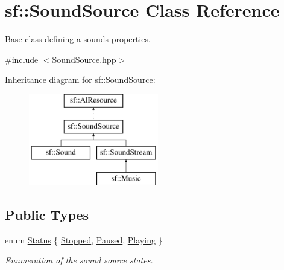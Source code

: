\hypertarget{classsf_1_1_sound_source}{}\section{sf\+:\+:Sound\+Source Class Reference}
\label{classsf_1_1_sound_source}


Base class defining a sound\textquotesingle{}s properties.  




{\ttfamily \#include $<$Sound\+Source.\+hpp$>$}

Inheritance diagram for sf\+:\+:Sound\+Source\+:\begin{figure}[H]
\begin{center}
\leavevmode
\includegraphics[height=4.000000cm]{classsf_1_1_sound_source}
\end{center}
\end{figure}
\subsection*{Public Types}
\begin{DoxyCompactItemize}
\item 
enum \mbox{\hyperlink{classsf_1_1_sound_source_ac43af72c98c077500b239bc75b812f03}{Status}} \{ \mbox{\hyperlink{classsf_1_1_sound_source_ac43af72c98c077500b239bc75b812f03adabb01e8aa85b2f54b344890addf764a}{Stopped}}, 
\mbox{\hyperlink{classsf_1_1_sound_source_ac43af72c98c077500b239bc75b812f03ac3ca1fcc0394267c9bdbe3dc0a8a7e41}{Paused}}, 
\mbox{\hyperlink{classsf_1_1_sound_source_ac43af72c98c077500b239bc75b812f03af07bdea9f70ef7606dfc9f955beeee18}{Playing}}
 \}
\begin{DoxyCompactList}\small\item\em Enumeration of the sound source states. \end{DoxyCompactList}\end{DoxyCompactItemize}
